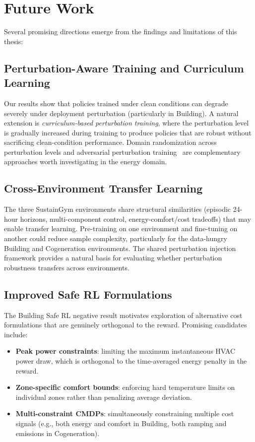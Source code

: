 \section{Future Work}
\label{sec:future_work}

Several promising directions emerge from the findings and limitations of this thesis:

\subsection{Perturbation-Aware Training and Curriculum Learning}

Our results show that policies trained under clean conditions can degrade severely under deployment perturbation (particularly in Building). A natural extension is \emph{curriculum-based perturbation training}, where the perturbation level is gradually increased during training to produce policies that are robust without sacrificing clean-condition performance. Domain randomization across perturbation levels and adversarial perturbation training~\citep{pinto2017rarl} are complementary approaches worth investigating in the energy domain.

\subsection{Cross-Environment Transfer Learning}

The three SustainGym environments share structural similarities (episodic 24-hour horizons, multi-component control, energy-comfort/cost tradeoffs) that may enable transfer learning. Pre-training on one environment and fine-tuning on another could reduce sample complexity, particularly for the data-hungry Building and Cogeneration environments. The shared perturbation injection framework provides a natural basis for evaluating whether perturbation robustness transfers across environments.

\subsection{Improved Safe RL Formulations}

The Building Safe RL negative result motivates exploration of alternative cost formulations that are genuinely orthogonal to the reward. Promising candidates include:
\begin{itemize}
    \item \textbf{Peak power constraints}: limiting the maximum instantaneous HVAC power draw, which is orthogonal to the time-averaged energy penalty in the reward.
    \item \textbf{Zone-specific comfort bounds}: enforcing hard temperature limits on individual zones rather than penalizing average deviation.
    \item \textbf{Multi-constraint CMDPs}: simultaneously constraining multiple cost signals (e.g., both energy and comfort in Building, both ramping and emissions in Cogeneration).
\end{itemize}

